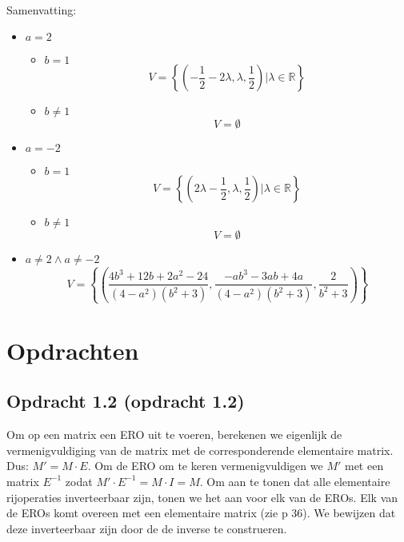 \documentclass[lineaire_algebra_oplossingen.tex]{subfiles}
\begin{document}
\\Samenvatting:
\begin{itemize}
\item $a=2$
\begin{itemize}
\item $b=1$
\[
V = \left\lbrace \left(-\frac{1}{2}-2\lambda,\lambda,\frac{1}{2}\right)| \lambda \in \mathbb{R}\right\rbrace
\]
\item $b\neq 1$
\[
V = \emptyset
\]
\end{itemize}
\item $a=-2$
\begin{itemize}
\item $b=1$
\[
V= \left\lbrace \left(2\lambda-\frac{1}{2},\lambda,\frac{1}{2}\right)| \lambda \in \mathbb{R}\right\rbrace
\]
\item $b\neq 1$
\[
V= \emptyset
\]
\end{itemize}
\item $a\neq 2 \wedge a \neq -2$ 
\[
V = \left\lbrace\left(\frac{4b^3+12b+2a^2-24}{(4-a^{2})(b^{2}+3)},\frac{-ab^{3}-3ab+4a}{(4-a^{2})(b^{2}+3)},\frac{2}{b^{2}+3}\right)\right\rbrace
\]
\end{itemize}

\section{Opdrachten}
\subsection{Opdracht 1.2 (opdracht 1.2)}
\label{1.2}
Om op een matrix een ERO uit te voeren, berekenen we eigenlijk de vermenigvuldiging van de matrix met de corresponderende elementaire matrix. Dus: $M' = M \cdot E$. Om de ERO om te keren vermenigvuldigen we $M'$ met een matrix $E^{-1}$ zodat $M'\cdot E^{-1} = M \cdot I = M$.
Om aan te tonen dat alle elementaire rijoperaties inverteerbaar zijn, tonen we het aan voor elk van de EROs. Elk van de EROs komt overeen met een elementaire matrix (zie p 36). We bewijzen dat deze inverteerbaar zijn door de de inverse te construeren.
\end{document}
